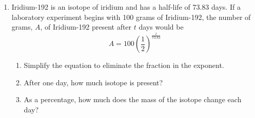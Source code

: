 \documentclass[12pt, oneside]{article}
\begin{document}
\begin{enumerate}
\newpage

\item Iridium-192 is an isotope of iridium and has a half-life of 73.83 days. If a laboratory experiment begins with 100 grams of Iridium-192, the number of grams, $A$, of Iridium-192 present after $t$ days would be 
\[A=100 \left( \frac{1}{2} \right)^\frac{t}{73.83}\]

\begin{enumerate}
    \item Simplify the equation to eliminate the fraction in the exponent.\\[30pt]
    \item After one day, how much isotope is present?\\[30pt]
    \item As a percentage, how much does the mass of the isotope change each day?\\[30pt]
\end{enumerate}


\end{enumerate}
\end{document}
